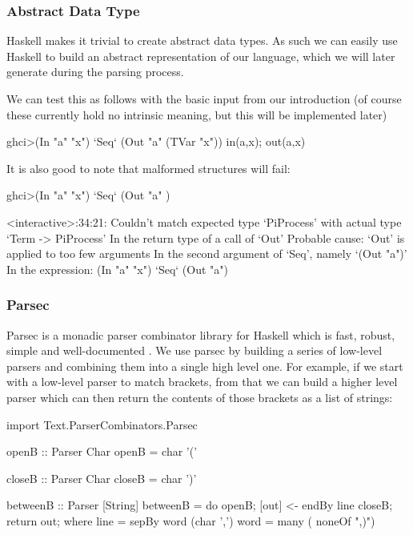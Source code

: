 \subsubsection{Abstract Data Type}
Haskell makes it trivial to create abstract data types. As such we can easily use Haskell to build an abstract representation of our language, which we will later generate during the parsing process.
    


We can test this as follows with the basic input from our introduction (of course these currently hold no intrinsic meaning, but this will be implemented later)

\begin{code}
    ghci>(In "a" "x") `Seq` (Out "a" (TVar "x"))
    in(a,x);
    out(a,x)
\end{code}

It is also good to note that malformed structures will fail:

\begin{code}
    ghci>(In "a" "x") `Seq` (Out "a" )

    <interactive>:34:21:
        Couldn't match expected type `PiProcess'
        with actual type `Term -> PiProcess'
        In the return type of a call of `Out'
        Probable cause: `Out' is applied to too few arguments
        In the second argument of `Seq', namely `(Out "a")'
        In the expression: (In "a" "x") `Seq` (Out "a")
\end{code}

\subsubsection{Parsec}

Parsec is a monadic parser combinator library for Haskell which is fast, robust, simple and well-documented \cite{lm01}. We use parsec by building a series of low-level parsers and combining them into a single high level one.
For example, if we start with a low-level parser to match brackets, from that we can build a higher level parser which can then return the contents of those brackets as a list of strings:

\begin{code}
import Text.ParserCombinators.Parsec

openB :: Parser Char
openB = char '(' 

closeB :: Parser Char
closeB = char ')' 

betweenB :: Parser [String]
betweenB = do{
            openB;
            [out] <- endBy line closeB;
            return out;
        } 
    where
        line = sepBy word (char ',')
        word = many ( noneOf ",)")
\end{code}

